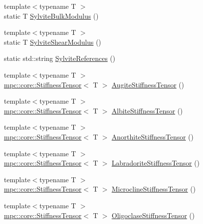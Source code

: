 \begin{DoxyCompactItemize}
\item 
{\footnotesize template$<$typename T $>$ }\\static T \mbox{\hyperlink{namespacempc_1_1data_a8773cc110ec7e99309a5970b4ddea457}{Sylvite\+Bulk\+Modulus}} ()
\item 
{\footnotesize template$<$typename T $>$ }\\static T \mbox{\hyperlink{namespacempc_1_1data_af3dbfa9d5e35d687ec9db62d3b04e79a}{Sylvite\+Shear\+Modulus}} ()
\item 
static std\+::string \mbox{\hyperlink{namespacempc_1_1data_aaf2dfd109b81445818b54d8c314b8e1a}{Sylvite\+References}} ()
\item 
{\footnotesize template$<$typename T $>$ }\\\mbox{\hyperlink{structmpc_1_1core_1_1_stiffness_tensor}{mpc\+::core\+::\+Stiffness\+Tensor}}$<$ T $>$ \mbox{\hyperlink{namespacempc_1_1data_acb1e90920b2d75cd9202cfe03cd98c1b}{Augite\+Stiffness\+Tensor}} ()
\item 
{\footnotesize template$<$typename T $>$ }\\\mbox{\hyperlink{structmpc_1_1core_1_1_stiffness_tensor}{mpc\+::core\+::\+Stiffness\+Tensor}}$<$ T $>$ \mbox{\hyperlink{namespacempc_1_1data_a0499acadde0327ae922ac340b6231298}{Albite\+Stiffness\+Tensor}} ()
\item 
{\footnotesize template$<$typename T $>$ }\\\mbox{\hyperlink{structmpc_1_1core_1_1_stiffness_tensor}{mpc\+::core\+::\+Stiffness\+Tensor}}$<$ T $>$ \mbox{\hyperlink{namespacempc_1_1data_a58f2b45217ae44a33ec0fe3ea46f40eb}{Anorthite\+Stiffness\+Tensor}} ()
\item 
{\footnotesize template$<$typename T $>$ }\\\mbox{\hyperlink{structmpc_1_1core_1_1_stiffness_tensor}{mpc\+::core\+::\+Stiffness\+Tensor}}$<$ T $>$ \mbox{\hyperlink{namespacempc_1_1data_a9acb3c22bd40c477d5a2f9937066a9bd}{Labradorite\+Stiffness\+Tensor}} ()
\item 
{\footnotesize template$<$typename T $>$ }\\\mbox{\hyperlink{structmpc_1_1core_1_1_stiffness_tensor}{mpc\+::core\+::\+Stiffness\+Tensor}}$<$ T $>$ \mbox{\hyperlink{namespacempc_1_1data_ac532f7ca3b056afbd470d469e730568a}{Microcline\+Stiffness\+Tensor}} ()
\item 
{\footnotesize template$<$typename T $>$ }\\\mbox{\hyperlink{structmpc_1_1core_1_1_stiffness_tensor}{mpc\+::core\+::\+Stiffness\+Tensor}}$<$ T $>$ \mbox{\hyperlink{namespacempc_1_1data_ac95f3f5f1edca76889006993ef8da74b}{Oligoclase\+Stiffness\+Tensor}} ()

\end{DoxyCompactItemize}
